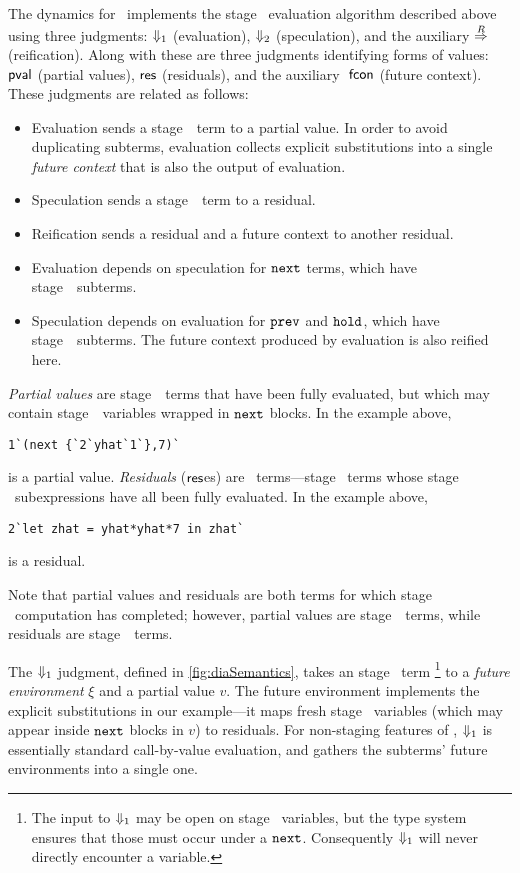 

The dynamics for \lang\ implements the stage \bbone\ evaluation algorithm
described above using three judgments: ${\Downarrow_{ 1}}$ (evaluation), ${\Downarrow_{ 2}}$
(speculation), and the auxiliary $\overset{R}\Rightarrow$ (reification). 
Along with these are three judgments identifying forms of values:
$\mathsf{pval}$ (partial values), $\mathsf{res}$ (residuals), 
and the auxiliary $\ \mathsf{fcon}$ (future context).
These judgments are related as follows:
\begin{itemize}
\item Evaluation sends a stage~\bbone\ term to a partial value.
In order to avoid duplicating subterms, evaluation collects explicit
substitutions into a single {\em future context} that is also the output of
evaluation.
\item Speculation sends a stage~\bbtwo\ term to a residual.
\item Reification sends a residual and a future context to another residual.  
\item Evaluation depends on speculation for ${\tt next}$ terms, which have
stage~\bbtwo\ subterms.
\item Speculation depends on evaluation for ${\tt prev}$ and ${\tt hold}$, which have
stage~\bbone\ subterms. The future context produced by evaluation is also
reified here.
\end{itemize}

\emph{Partial values} are stage~\bbone\ terms that have been fully
evaluated, but which may contain stage~\bbtwo\ variables wrapped in ${\tt next}$
blocks.  In the example above, 
\begin{lstlisting} 
1`(next {`2`yhat`1`},7)`
\end{lstlisting}
is a partial value.
\emph{Residuals} ($\mathsf{res}$es) are \langTwo\ terms---stage \bbtwo\ terms whose
stage \bbone\ subexpressions have all been fully evaluated. In the example
above,
\begin{lstlisting} 
2`let zhat = yhat*yhat*7 in zhat`
\end{lstlisting}
is a residual.

Note that partial values and residuals are both terms for which stage \bbone\
computation has completed; however, partial values are stage~\bbone\ terms,
while residuals are stage~\bbtwo\ terms.

The ${\Downarrow_{ 1}}$ judgment, defined in \ref{fig:diaSemantics}, takes an stage
\bbone\ term%
\footnote{ The input to ${\Downarrow_{ 1}}$ may be open on stage \bbtwo\ variables, but
the type system ensures that those must occur under a ${\tt next}$. Consequently
${\Downarrow_{ 1}}$ will never directly encounter a variable.}
%
to a {\em future environment} $\xi$ and a partial value $v$. The future
environment implements the explicit substitutions in our example---it maps fresh
stage \bbtwo\ variables (which may appear inside ${\tt next}$ blocks in $v$) to
residuals. For non-staging features of \lang, ${\Downarrow_{ 1}}$ is essentially
standard call-by-value evaluation, and gathers the subterms' future environments
into a single one.

